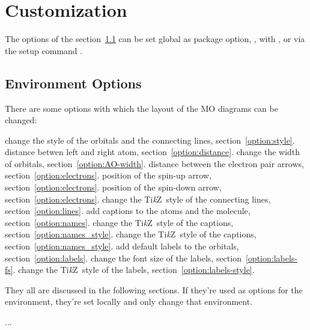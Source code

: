 \documentclass[load-preamble+]{cnltx-doc}
\newcommand*\TikZ{Ti\textit{k}Z}
\begin{document}
\section{Customization}
The options of the section~\ref{ssec:umgebungs_optionen} can be set global as
package option, \ie, with , or
via the setup command .

\subsection{Environment Options}\label{ssec:umgebungs_optionen}
There are some options with which the layout of the \ac{MO} diagrams can be
changed:
\begin{options}
    change the style of the orbitals and the connecting lines,
    section~\ref{option:style}.
    distance betwen left and right atom,
    section~\ref{option:distance}.
    change the width of orbitals,
    section~\ref{option:AO-width}.
    distance between the electron pair arrows,
    section~\ref{option:electrons}.
    position of the spin-up arrow,
    section~\ref{option:electrons}.
    position of the spin-down arrow,
    section~\ref{option:electrons}.
    change the \TikZ\ style of the connecting lines,
    section~\ref{option:lines}.
    add captions to the atoms and the molecule,
    section~\ref{option:names}.
    change the \TikZ\ style of the captions,
    section~\ref{option:names_style}.
    change the \TikZ\ style of the captions,
    section~\ref{option:names_style}.
    add default labels to the orbitals,
    section~\ref{option:labels}.
    change the font size of the labels,
    section~\ref{option:labels-fs}.
    change the \TikZ\ style of the labels,
    section~\ref{option:labels-style}.
\end{options}
They all are discussed in the following sections.  If they're used as options
for the environment, they're set locally and only change that environment.
\begin{sourcecode}
  \begin{MOdiagram}[options]
    ...
  \end{MOdiagram}
\end{sourcecode}
\end{document}
